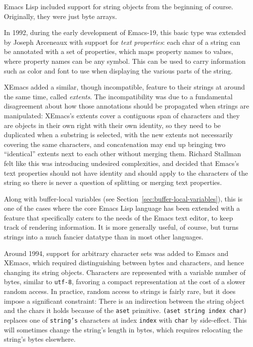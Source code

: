 \documentclass[format=acmsmall, review]{acmart}
\newcommand \Elisp {Emacs Lisp}
\begin{document}
\Elisp{} included support for string objects from the beginning of course.
Originally, they were just byte arrays.

In 1992, during the early development of Emacs-19, this basic type was
extended by Joseph Arceneaux with support for \emph{text properties}: each
char of a string can be annotated with a set of properties, which maps
property names to values, where property names can be any symbol.  This can
be used to carry information such as color and font to use when displaying
the various parts of the string.

XEmacs added a similar, though incompatible, feature to their strings at
around the same time, called \emph{extents}.  The incompatibility was due to
a fundamental disagreement about how those annotations should be propagated
when strings are manipulated: XEmacs's extents cover a contiguous span of
characters and they are objects in their own right with their own identity,
so they need to be duplicated when a substring is selected, with the new
extents not necessarily covering the same characters, and concatenation may
end up bringing two ``identical'' extents next to each other 
without merging them.  Richard Stallman felt like this was introducing
undesired complexities, and decided that Emacs's text properties should not
have identity and should apply to the characters of the string so there is
never a question of splitting or merging text properties.

Along with buffer-local variables (see Section~\ref{sec:buffer-local-variables}), this is one of
the cases where the core \Elisp{} language has been extended with
a feature that specifically caters to the needs of the Emacs text editor, to
keep track of rendering information.  It is more generally useful, of
course, but turns strings into a much fancier datatype than in most
other languages.

Around 1994, support for arbitrary character sets was added to Emacs and
XEmacs, which required distinguishing between bytes and characters, and
hence changing its string objects.  Characters are represented with
a variable number of bytes, similar to \texttt{utf-8}, favoring a compact
representation at the cost of a slower random access.  In practice, random
access to strings is fairly rare, but it does
impose a significant constraint: There is an indirection between the string
object and the chars it holds because of the \texttt{aset} primitive.
\texttt{(aset string index char)}
replaces one of \texttt{string's} characters at index \texttt{index}
with \texttt{char} by side-effect.  This will
sometimes change the string's length in bytes, which requires relocating
the string's bytes elsewhere.
\end{document}
